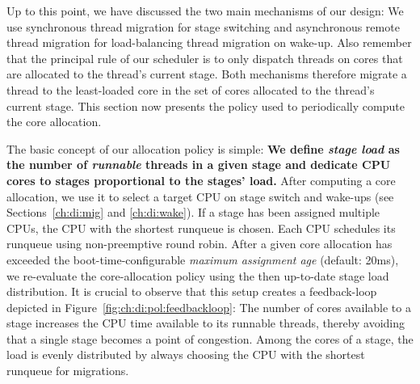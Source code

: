\documentclass[12pt,a4paper]{book}
\begin{document}
%
Up to this point, we have discussed the two main mechanisms of our design:
We use synchronous thread migration for stage switching and asynchronous remote thread migration for load-balancing thread migration on wake-up.
Also remember that the principal rule of our scheduler is to only dispatch threads on cores that are allocated to the thread's current stage.
Both mechanisms therefore migrate a thread to the least-loaded core in the set of cores allocated to the thread's current stage.
This section now presents the policy used to periodically compute the core allocation.


The basic concept of our allocation policy is simple:
\textbf{We define \emph{stage load} as the number of \emph{runnable} threads in a given stage and dedicate CPU cores to stages proportional to the stages' load.}
After computing a core allocation, we use it to select a target CPU on stage switch and wake-ups (see Sections~\ref{ch:di:mig} and \ref{ch:di:wake}).
If a stage has been assigned multiple CPUs, the CPU with the shortest runqueue is chosen.
Each CPU schedules its runqueue using non-preemptive round robin.
After a given core allocation has exceeded the boot-time-configurable \emph{maximum assignment age} (default: 20ms), we re-evaluate the core-allocation policy using the then up-to-date stage load distribution.
It is crucial to observe that this setup creates a feedback-loop depicted in Figure~\ref{fig:ch:di:pol:feedbackloop}:
The number of cores available to a stage increases the CPU time available to its runnable threads, thereby avoiding that a single stage becomes a point of congestion.
Among the cores of a stage, the load is evenly distributed by always choosing the CPU with the shortest runqueue for migrations.
\end{document}

